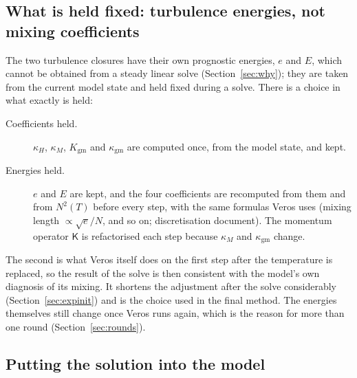 \documentclass{article}
\begin{document}
\subsection{What is held fixed: turbulence energies, not mixing coefficients}\label{sec:closures}

The two turbulence closures have their own prognostic energies, $e$ and $E$, which cannot be obtained from a steady linear solve (Section~\ref{sec:why}); they are taken from the current model state and held fixed during a solve. There is a choice in what exactly is held:
\begin{description}
\item[Coefficients held.] $\kappa_H$, $\kappa_M$, $K_\text{gm}$ and $\kappa_\text{gm}$ are computed once, from the model state, and kept.
\item[Energies held.] $e$ and $E$ are kept, and the four coefficients are recomputed from them and from $N^2(T)$ before every step, with the same formulas Veros uses (mixing length $\propto\sqrt{e}/N$, and so on; discretisation document). The momentum operator $\mathsf{K}$ is refactorised each step because $\kappa_M$ and $\kappa_\text{gm}$ change.
\end{description}
The second is what Veros itself does on the first step after the temperature is replaced, so the result of the solve is then consistent with the model's own diagnosis of its mixing. It shortens the adjustment after the solve considerably (Section~\ref{sec:expinit}) and is the choice used in the final method. The energies themselves still change once Veros runs again, which is the reason for more than one round (Section~\ref{sec:rounds}).

\subsection{Putting the solution into the model}\label{sec:patch}
\end{document}
